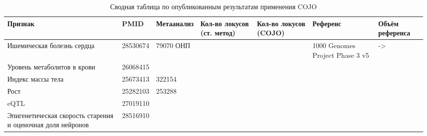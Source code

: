 \documentclass[a4paper,14pt,russian]{extreport}
\begin{document}
\begin{sidewaystable}
	\setlength\tabcolsep{6pt}  %
	\centering
	\scriptsize
	\begin{tabular}{ | L{4cm} | l | l | l | l | l | l |}
     		\hline
			Признак & PMID & Метаанализ & Кол-во локусов (ст. метод) & Кол-во локусов (COJO) & Референс & Объём референса \bigstrut\\ \hline
			Ишемическая болезнь сердца & 28530674 & 79070 ОНП &  &  & 1000 Genomes Project Phase 3 v5 & -> \bigstrut\\ \hline
			Уровень метаболитов в крови & 26068415 & & & & & \bigstrut\\ \hline
			Индекс массы тела & 25673413 & 322154 & & & & \bigstrut\\ \hline
			Рост & 25282103 & 253288 & & & & \bigstrut\\ \hline
			eQTL & 27019110 & & & & & \bigstrut\\ \hline
			Эпигенетическая скорость старения и оценочная доля нейронов & 28516910 & & & & & \bigstrut\\ \hline
\end{tabular}
\label{tab:addlabel}
\caption{Сводная таблица по опубликованным результатам применения COJO}
\end{sidewaystable}
\end{document}

